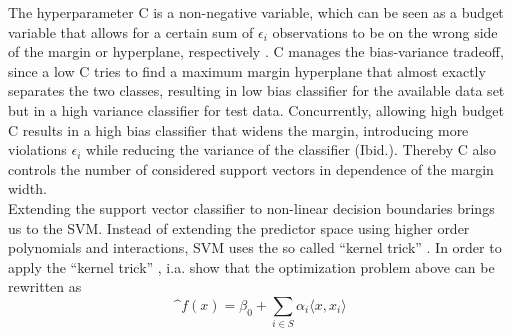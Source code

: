 The hyperparameter C is a non-negative variable, which can be seen as a budget variable that allows for a certain sum of $\epsilon_i$ observations to be on the wrong side of the margin or hyperplane, respectively \cite{James:2014:ISL:2517747}. C manages the bias-variance tradeoff, since a low C tries to find a maximum margin hyperplane that almost exactly separates the two classes, resulting in low bias classifier for the available data set but in a high variance classifier for test data. Concurrently, allowing high budget C results in a high bias classifier that widens the margin, introducing more violations $\epsilon_i$ while reducing the variance of the classifier (Ibid.). Thereby C also controls the number of considered support vectors in dependence of the margin width.\\

Extending the support vector classifier to non-linear decision boundaries brings us to the SVM. Instead of extending the predictor space using higher order polynomials and interactions, SVM uses the so called ``kernel trick'' \cite{efron_hastie_2016}. In order to apply the ``kernel trick'' , i.a. \citeauthor{efron_hastie_2016} show that the optimization problem above can be rewritten as
\begin{equation}
  \^{f}(x) = \beta_0 + \sum_{i \in S} \alpha_i \langle x, x_i \rangle
\end{equation}

